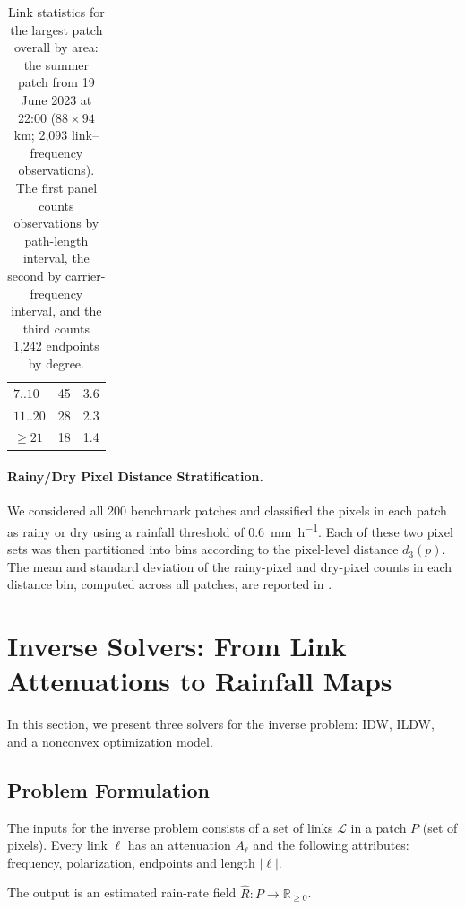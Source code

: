\documentclass[a4paper,fleqn]{cas-sc}
\newcommand{\notebox}[3]{%
  \begingroup
  \setlength{\fboxsep}{2pt}%
  \fcolorbox{#1}{#2}{\textsf{\footnotesize #3}}%
  \endgroup
}
\DeclareRobustCommand{\editnote}[1]{%
  \texorpdfstring{%
    \nobreak\hfill
    \mbox{\notebox{red!50!black}{red!10}{#1}}%
  }{}%
}
\begin{document}
\begin{table}[!htbp]
\begin{minipage}[t]{0.31\textwidth}
\begin{tabular}{lrr}
      $7..10$             & 45    & 3.6  \\
      $11..20$            & 28    & 2.3  \\
      $\geq 21$          & 18    & 1.4  \\
      \bottomrule
    \end{tabular}
  \end{minipage}
  \caption{Link statistics for the largest patch overall by area: the summer patch from 19 June 2023 at 22:00 ($88\times 94$ \si{\kilo\meter}; 2,093 link--frequency observations). The first panel counts observations by path-length interval, the second by carrier-frequency interval, and the third counts 1,242 endpoints by degree.}
  \label{tab:largest_patch_distributions}
\end{table}



\paragraph{Rainy/Dry Pixel Distance Stratification.}
We considered all 200 benchmark patches and classified the pixels in each patch as rainy or dry using a rainfall threshold of \SI[round-mode=none]{0.6}{\milli\meter\per\hour}.
Each of these two pixel sets was then partitioned into bins according to the pixel-level distance $d_3(p)$.
The mean and standard deviation of the rainy-pixel and dry-pixel counts in each distance bin, computed across all patches, are reported in .



\section{Inverse Solvers: From Link Attenuations to Rainfall Maps\editnote{GE:stable}}
In this section, we present three solvers for the inverse problem: IDW, ILDW, and a nonconvex optimization model.

\subsection{Problem Formulation}
The inputs for the inverse problem consists of a set of links $\mathcal{L}$ in a patch $P$ (set of pixels). Every link $\ell$ has an attenuation $A_{\ell}$ and the following attributes: frequency, polarization, endpoints and length $|\ell|$.

The output is an estimated rain-rate field $\hat{R}:P\rightarrow \mathbb{R}_{\geq 0}$.
\end{document}
